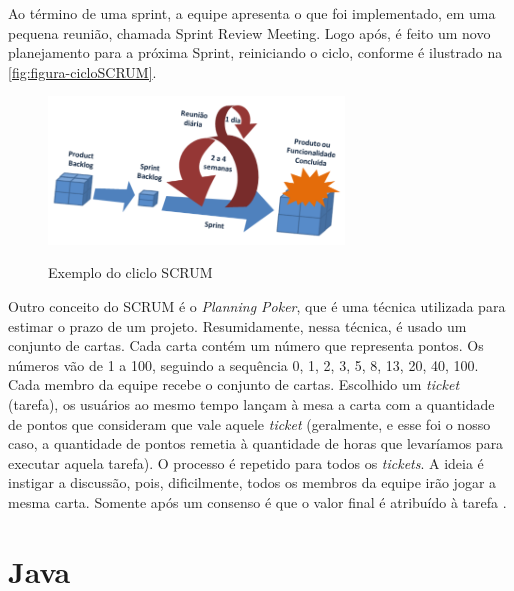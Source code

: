 Ao término de uma sprint, a equipe apresenta o que foi implementado, em uma pequena reunião, chamada Sprint Review Meeting. Logo após, é feito um novo planejamento para a próxima Sprint, reiniciando o ciclo, conforme é ilustrado na \autoref{fig:figura-cicloSCRUM}.


\begin{figure}[!htb]
    \centering
    \caption{Exemplo do cliclo SCRUM}
    \includegraphics[width=0.7\textwidth]{./dados/figuras/cicloSCRUM}
    \label{fig:figura-cicloSCRUM}
\end{figure}

Outro conceito do SCRUM é o \textit{Planning Poker}, que é uma técnica utilizada para estimar o prazo de um projeto. Resumidamente, nessa técnica, é usado um conjunto de cartas. Cada carta contém um número que representa pontos. Os números vão de 1 a 100, seguindo a sequência 0, 1, 2, 3, 5, 8, 13, 20, 40, 100. Cada membro da equipe recebe o conjunto de cartas. Escolhido um \textit{ticket} (tarefa), os usuários ao mesmo tempo lançam à mesa a carta com a quantidade de pontos que consideram que vale aquele \textit{ticket} (geralmente, e esse foi o nosso caso, a quantidade de pontos remetia à quantidade de horas que levaríamos para executar aquela tarefa). O processo é repetido para todos os \textit{tickets}. A ideia é instigar a discussão, pois, dificilmente, todos os membros da equipe irão jogar a mesma carta. Somente após um consenso é que o valor final é atribuído à tarefa \cite{Sabbagh2014}.

\section{Java}
\label{sec:embasamentoTeoricoJava}

